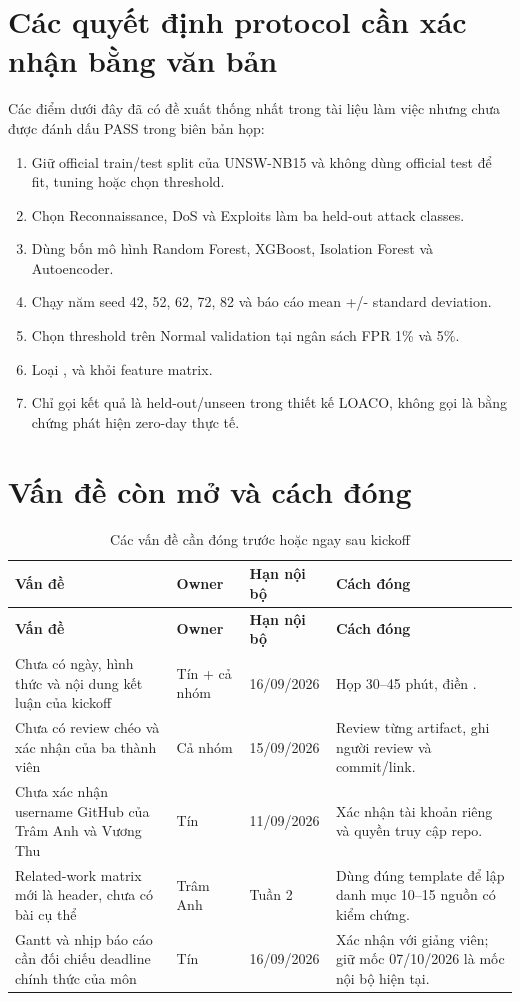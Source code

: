 \documentclass[12pt,a4paper,oneside]{article}
\begin{document}
\section{Các quyết định protocol cần xác nhận bằng văn bản}

Các điểm dưới đây đã có đề xuất thống nhất trong tài liệu làm việc nhưng chưa được đánh dấu PASS trong biên bản họp:

\begin{enumerate}[label=\arabic*.,leftmargin=1.1cm,itemsep=0.25em]
  \item Giữ official train/test split của UNSW-NB15 và không dùng official test để fit, tuning hoặc chọn threshold.
  \item Chọn Reconnaissance, DoS và Exploits làm ba held-out attack classes.
  \item Dùng bốn mô hình Random Forest, XGBoost, Isolation Forest và Autoencoder.
  \item Chạy năm seed 42, 52, 62, 72, 82 và báo cáo mean +/- standard deviation.
  \item Chọn threshold trên Normal validation tại ngân sách FPR 1\% và 5\%.
  \item Loại ,  và  khỏi feature matrix.
  \item Chỉ gọi kết quả là held-out/unseen trong thiết kế LOACO, không gọi là bằng chứng phát hiện zero-day thực tế.
\end{enumerate}

\section{Vấn đề còn mở và cách đóng}

\small
\renewcommand{\arraystretch}{1.3}
\noindent\begin{longtable}{L{4.2cm}C{2.0cm}C{2.1cm}L{5.0cm}}
\caption{Các vấn đề cần đóng trước hoặc ngay sau kickoff}\label{tab:open}\\
\toprule
\textbf{Vấn đề} & \textbf{Owner} & \textbf{Hạn nội bộ} & \textbf{Cách đóng}\\
\midrule
\endfirsthead
\toprule
\textbf{Vấn đề} & \textbf{Owner} & \textbf{Hạn nội bộ} & \textbf{Cách đóng}\\
\midrule
\endhead
\bottomrule
\endfoot
Chưa có ngày, hình thức và nội dung kết luận của kickoff & Tín + cả nhóm & 16/09/2026 & Họp 30--45 phút, điền .\\
Chưa có review chéo và xác nhận của ba thành viên & Cả nhóm & 15/09/2026 & Review từng artifact, ghi người review và commit/link.\\
Chưa xác nhận username GitHub của Trâm Anh và Vương Thu & Tín & 11/09/2026 & Xác nhận tài khoản riêng và quyền truy cập repo.\\
Related-work matrix mới là header, chưa có bài cụ thể & Trâm Anh & Tuần 2 & Dùng đúng template để lập danh mục 10--15 nguồn có kiểm chứng.\\
Gantt và nhịp báo cáo cần đối chiếu deadline chính thức của môn & Tín & 16/09/2026 & Xác nhận với giảng viên; giữ mốc 07/10/2026 là mốc nội bộ hiện tại.\\
\end{longtable}
\normalsize
\end{document}
